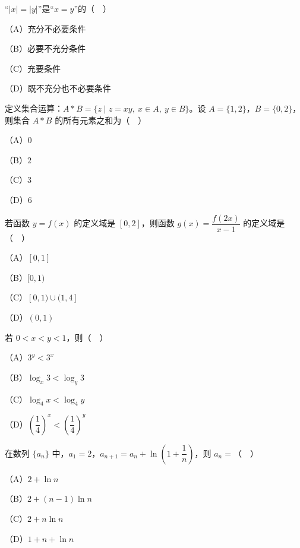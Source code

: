 


\begin{question}
“$|x|=|y|$”是“$x=y$”的（　）

（A）充分不必要条件

（B）必要不充分条件

（C）充要条件

（D）既不充分也不必要条件

\end{question}
\begin{question}
定义集合运算：$A*B=\{z\mid z=xy,\ x\in A,\ y\in B\}$。设 $A=\{1,2\}$，$B=\{0,2\}$，则集合 $A*B$ 的所有元素之和为（　）

（A）$0$

（B）$2$

（C）$3$

（D）$6$

\end{question}
\begin{question}
若函数 $y=f(x)$ 的定义域是 $[0,2]$，则函数 $g(x)=\dfrac{f(2x)}{x-1}$ 的定义域是（　）

（A）$[0,1]$

（B）$[0,1)$

（C）$[0,1)\cup(1,4]$

（D）$(0,1)$

\end{question}
\begin{question}
若 $0<x<y<1$，则（　）

（A）$3^y<3^x$

（B）$\log_x3<\log_y3$

（C）$\log_4x<\log_4y$

（D）$\left(\dfrac14\right)^x<\left(\dfrac14\right)^y$

\end{question}
\begin{question}
在数列 $\{a_n\}$ 中，$a_1=2$，$a_{n+1}=a_n+\ln\left(1+\dfrac1n\right)$，则 $a_n=$（　）

（A）$2+\ln n$

（B）$2+(n-1)\ln n$

（C）$2+n\ln n$

（D）$1+n+\ln n$

\end{question}
